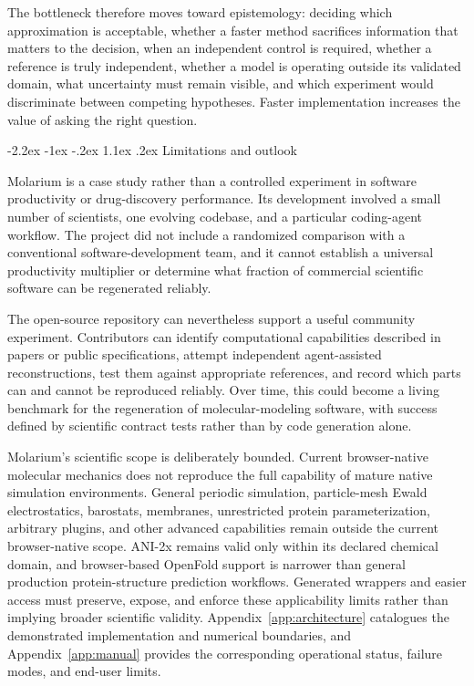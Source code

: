 \documentclass[11pt]{article}
\makeatletter
\renewcommand\section{\@startsection{section}{1}{\z@}%
  {-2.2ex \@plus -1ex \@minus -.2ex}%
  {1.1ex \@plus .2ex}%
  {\normalfont\Large\bfseries\color{molblue}}}
\makeatother
\begin{document}
The bottleneck therefore moves toward epistemology: deciding which approximation is acceptable, whether a faster method sacrifices information that matters to the decision, when an independent control is required, whether a reference is truly independent, whether a model is operating outside its validated domain, what uncertainty must remain visible, and which experiment would discriminate between competing hypotheses. Faster implementation increases the value of asking the right question.

\section{Limitations and outlook}

Molarium is a case study rather than a controlled experiment in software productivity or drug-discovery performance. Its development involved a small number of scientists, one evolving codebase, and a particular coding-agent workflow. The project did not include a randomized comparison with a conventional software-development team, and it cannot establish a universal productivity multiplier or determine what fraction of commercial scientific software can be regenerated reliably.

The open-source repository can nevertheless support a useful community experiment. Contributors can identify computational capabilities described in papers or public specifications, attempt independent agent-assisted reconstructions, test them against appropriate references, and record which parts can and cannot be reproduced reliably. Over time, this could become a living benchmark for the regeneration of molecular-modeling software, with success defined by scientific contract tests rather than by code generation alone.

Molarium's scientific scope is deliberately bounded. Current browser-native molecular mechanics does not reproduce the full capability of mature native simulation environments. General periodic simulation, particle-mesh Ewald electrostatics, barostats, membranes, unrestricted protein parameterization, arbitrary plugins, and other advanced capabilities remain outside the current browser-native scope. ANI-2x remains valid only within its declared chemical domain, and browser-based OpenFold support is narrower than general production protein-structure prediction workflows. Generated wrappers and easier access must preserve, expose, and enforce these applicability limits rather than implying broader scientific validity. Appendix~\ref{app:architecture} catalogues the demonstrated implementation and numerical boundaries, and Appendix~\ref{app:manual} provides the corresponding operational status, failure modes, and end-user limits.
\end{document}
